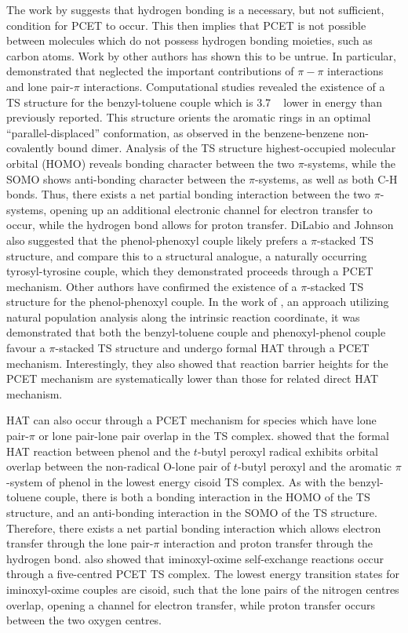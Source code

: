 The work by \citet{Mayer2002} suggests that hydrogen bonding is a necessary, but not sufficient, condition for PCET to occur. This then implies that PCET is not possible between molecules which do not possess hydrogen bonding moieties, such as carbon atoms. Work by other authors has shown this to be untrue.\cite{Hatcher2007, DiLabio2007} In particular, \citet{DiLabio2007} demonstrated that \citet{Mayer2002} neglected the important contributions of $\pi-\pi$ interactions and lone pair-$\pi$ interactions. Computational studies revealed the existence of a TS structure for the benzyl-toluene couple which is 3.7 \kcalmol~ lower in energy than previously reported. This structure orients the aromatic rings in an optimal ``parallel-displaced'' conformation, as observed in the benzene-benzene non-covalently bound dimer.\cite{Sinnokrot2002}
Analysis of the TS structure highest-occupied molecular orbital (HOMO) reveals bonding character between the two $\pi$-systems, while the SOMO shows anti-bonding character between the $\pi$-systems, as well as both C-H bonds. Thus, there exists a net partial bonding interaction between the two $\pi$-systems, opening up an additional electronic channel for electron transfer to occur, while the hydrogen bond allows for proton transfer. DiLabio and Johnson also suggested that the phenol-phenoxyl couple likely prefers a $\pi$-stacked TS structure, and compare this to a structural analogue, a naturally occurring tyrosyl-tyrosine couple, which they demonstrated proceeds through a PCET mechanism. Other authors have confirmed the existence of a $\pi$-stacked TS structure for the phenol-phenoxyl couple.\cite{Sirjoosingh2011, HammesSchiffer2015, MunozRugeles2017} In the work of \citet{MunozRugeles2017}, an approach utilizing natural population analysis along the intrinsic reaction coordinate, it was demonstrated that both the benzyl-toluene couple and phenoxyl-phenol couple favour a $\pi$-stacked TS structure and undergo formal HAT through a PCET mechanism. Interestingly, they also showed that reaction barrier heights for the PCET mechanism are systematically lower than those for related direct HAT mechanism.

HAT can also occur through a PCET mechanism for species which have lone pair-$\pi$ or lone pair-lone pair overlap in the TS complex.\cite{DiLabio2007, DiLabio2005} \citet{DiLabio2007} showed that the formal HAT reaction between phenol and the $t$-butyl peroxyl radical exhibits orbital overlap between the non-radical O-lone pair of $t$-butyl peroxyl and the aromatic $\pi$-system of phenol in the lowest energy cisoid TS complex. As with the benzyl-toluene couple, there is both a bonding interaction in the HOMO of the TS structure, and an anti-bonding interaction in the SOMO of the TS structure. Therefore, there exists a net partial bonding interaction which allows electron transfer through the lone pair-$\pi$ interaction and proton transfer through the hydrogen bond. \citet{DiLabio2005} also showed that iminoxyl-oxime self-exchange reactions occur through a five-centred PCET TS complex. The lowest energy transition states for iminoxyl-oxime couples are cisoid, such that the lone pairs of the nitrogen centres overlap, opening a channel for electron transfer, while proton transfer occurs between the two oxygen centres.

